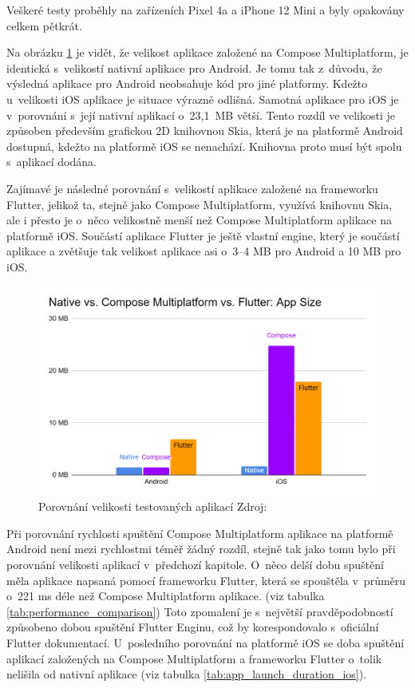 Veškeré testy proběhly na zařízeních Pixel 4a a iPhone 12 Mini a byly opakovány celkem pětkrát.





Na obrázku \ref{fig:chart_app_sizes} je vidět, že velikost aplikace založené na Compose Multiplatform, je identická
s~velikostí nativní aplikace pro Android. Je tomu tak z~důvodu, že výsledná aplikace pro Android neobsahuje kód 
pro jiné platformy. \cite{imgAndroidFlutterCompose} Kdežto u~velikosti iOS aplikace je situace výrazně odlišná. Samotná aplikace pro iOS je v~porovnání
s~její nativní aplikací o~23,1~MB větší. Tento rozdíl ve velikosti je způsoben především grafickou 2D knihovnou Skia,
která je na platformě Android dostupná, kdežto na platformě iOS se nenachází. Knihovna proto musí být spolu s~aplikací dodána. \cite{imgAndroidFlutterCompose}

Zajímavé je následné porovnání s~velikostí aplikace založené na frameworku Flutter, jelikož ta, stejně jako Compose
Multiplatform, využívá knihovnu Skia, ale i přesto je o~něco velikostně menší než Compose Multiplatform aplikace na platformě iOS.
Součástí aplikace Flutter je ještě vlastní engine, který je součástí aplikace a zvětšuje tak velikost aplikace asi o~3–4 MB pro Android a 10 MB 
pro iOS. \cite{flutterSize}

\begin{figure}[H]
  \centering
  \includegraphics[width=.7\textwidth]{chart_app_sizes.png}
  \caption{Porovnání velikosti testovaných aplikací Zdroj: \cite{imgAndroidFlutterCompose}}
  \label{fig:chart_app_sizes}
\end{figure}


Při porovnání rychlosti spuštění Compose Multiplatform aplikace na platformě Android není mezi rychlostmi téměř žádný
rozdíl, stejně tak jako tomu bylo při porovnání velikosti aplikací v~předchozí kapitole. O~něco delší dobu spuštění měla
aplikace napsaná pomocí frameworku Flutter, která se spouštěla v~průměru o~221 ms déle než Compose Multiplatform aplikace. (viz tabulka \ref{tab:performance_comparison})
Toto zpomalení je s~největší pravděpodobností způsobeno dobou spuštění Flutter Enginu, což by korespondovalo s~oficiální
Flutter dokumentací. \cite{flutterPerformance}
U~posledního porovnání na platformě iOS se doba spuštění aplikací založených na Compose Multiplatform a frameworku 
Flutter o~tolik nelišila od nativní aplikace (viz tabulka \ref{tab:app_launch_duration_ios}).

